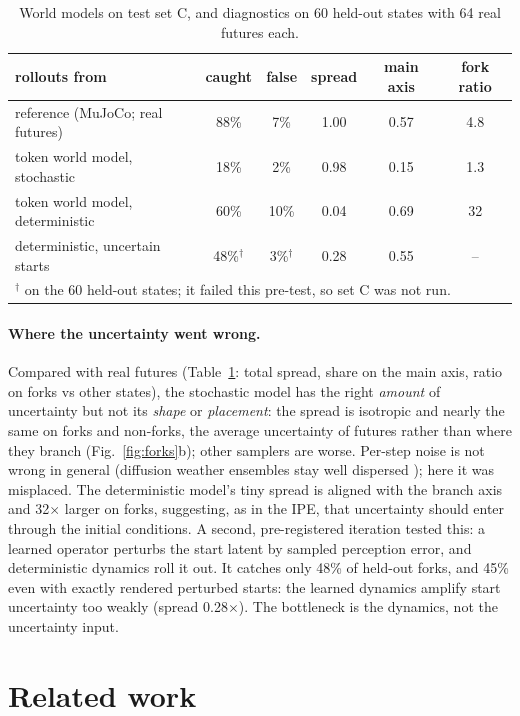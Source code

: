 \documentclass{article}
\begin{document}
\begin{table}[t]
\centering
\caption{World models on test set C, and diagnostics on 60 held-out states with 64 real futures each.}
\label{tab:wm}
\small
\begin{tabular}{lccccc}
\toprule
rollouts from & caught & false & spread & main axis & fork ratio \\
\midrule
reference (MuJoCo; real futures) & 88\% & 7\% & 1.00 & 0.57 & 4.8 \\
token world model, stochastic & 18\% & 2\% & 0.98 & 0.15 & 1.3 \\
token world model, deterministic & 60\% & 10\% & 0.04 & 0.69 & 32 \\
deterministic, uncertain starts & 48\%$^\dagger$ & 3\%$^\dagger$ & 0.28 & 0.55 & -- \\
\bottomrule
\multicolumn{6}{l}{\footnotesize $^\dagger$ on the 60 held-out states; it failed this pre-test, so set C was not run.}
\end{tabular}
\end{table}

\paragraph{Where the uncertainty went wrong.} Compared with real futures (Table~\ref{tab:wm}: total spread,
share on the main axis, ratio on forks vs other states), the stochastic model has the right \emph{amount} of uncertainty but not its \emph{shape} or \emph{placement}:
the spread is isotropic and nearly the same on forks and non-forks, the average uncertainty of futures
rather than where they branch (Fig.~\ref{fig:forks}b); other samplers are worse. Per-step noise is not
wrong in general (diffusion weather ensembles stay well dispersed \citep{price2025gencast}); here it was
misplaced. The deterministic model's tiny spread is aligned with the branch axis and 32$\times$ larger on
forks, suggesting, as in the IPE, that uncertainty should enter through the initial conditions. A second,
pre-registered iteration tested this: a learned operator perturbs the start latent by sampled perception
error, and deterministic dynamics roll it out. It catches only 48\% of held-out forks, and 45\% even
with exactly rendered perturbed starts: the learned dynamics amplify start uncertainty too weakly
(spread 0.28$\times$). The bottleneck is the dynamics, not the uncertainty input.

\section{Related work}
\end{document}
